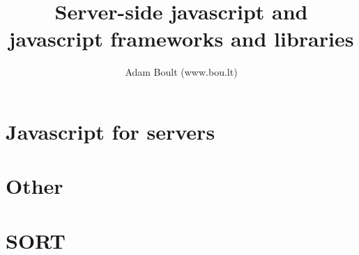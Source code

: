\documentclass[oneside]{book}
\begin{document}
\author{Adam Boult (www.bou.lt)}
\title{Server-side javascript and javascript frameworks and libraries}
\maketitle

\setcounter{tocdepth}{0}
\tableofcontents



\part{Javascript for servers}







\part{Other}


\part{SORT}

\end{document}
